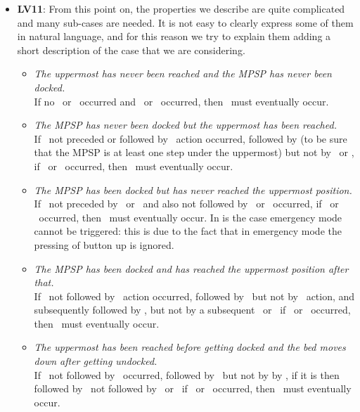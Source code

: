 \begin{itemize}
    \item \textbf{LV11}: From this point on, the properties we describe are quite complicated and many sub-cases are needed.
    It is not easy to clearly express some of them in natural language, and for this reason we try to explain them adding a short description of the case that we are considering.

    \begin{itemize}
        \item \textit{The uppermost has never been reached and the MPSP has never been docked.}\\
        If no \dock\ or \uppermostReached\ occurred and \pressUp\ or \tapUp\ occurred, then \motorUp\ must eventually occur.

        \item \textit{The MPSP has never been docked but the uppermost has been reached.}\\
        If \uppermostReached\ not preceded or followed by \dock\ action occurred, followed by \motorDown (to be sure that the MPSP is at least one step under the uppermost) but not by \dock\ or \uppermostReached, if \pressUp\ or \pressDown\ occurred, then \motorUp\ must eventually occur.

        \item \textit{The MPSP has been docked but has never reached the uppermost position.}\\
        If \undock\ not preceded by \uppermostReached\ or \emergencyMode\, and also not followed by \dock\ or \uppermostReached\ occurred, if \pressUp\ or \pressDown\ occurred, then \motorUp\ must eventually occur.
        In is the case emergency mode cannot be triggered: this is due to the fact that in emergency mode the pressing of button up is ignored.

        \item \textit{The MPSP has been docked and has reached the uppermost position after that.}\\
        If \undock\ not followed by \dock\ action occurred, followed by  \uppermostReached\ but not by \dock\ action, and subsequently followed by \motorDown, but not by a subsequent \dock\ or \uppermostReached\, if \pressUp\ or \pressDown\ occurred, then \motorUp\ must eventually occur.

        \item \textit{The uppermost has been reached before getting docked and the bed moves down after getting undocked.}\\
        If \uppermostReached\ not followed by \motorDown\ occurred, followed by \undock\ but not by by \dock, if it is then followed by \motorDown\ not followed by \dock\ or \uppermostReached\, if \pressUp\ or \pressDown\ occurred, then \motorUp\ must eventually occur.


\end{itemize}
\end{itemize}
